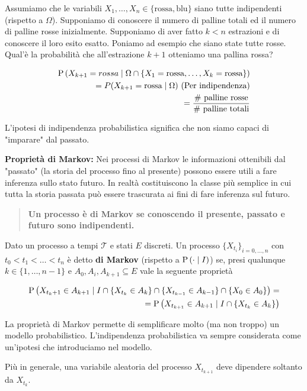 \begin{exmp}
	Assumiamo che le variabili $ X_1, \hdots, X_n \in \{\text{rossa}, \text{blu}\} $ siano tutte indipendenti (rispetto a $ \Omega $). Supponiamo di conoscere il numero di palline totali ed il numero di palline rosse inizialmente. Supponiamo di aver fatto $ k < n $ estrazioni e di conoscere il loro esito esatto. Poniamo ad esempio che siano state tutte rosse. Qual'\`e la probabilit\`a che all'estrazione $ k+1 $ otteniamo una pallina rossa?
	
	\begin{equation*}
	\begin{aligned}
	\text{P}\left(X_{k+1} = rossa \mid \Omega \cap \{X_1 = \text{rossa}, \hdots, X_k = \text{rossa} \} \right) \\
	= P(X_{k+1} = \text{rossa} \mid \Omega)	\text{  (Per indipendenza)} \\
	= \dfrac{\text{\# palline rosse}}{\text{\# palline totali}}
	\end{aligned}
	\end{equation*}
	
	L'ipotesi di indipendenza probabilistica significa che non siamo capaci di "imparare" dal passato.
	
\end{exmp}

\begin{defn}
	\textbf{Propriet\`a di Markov:}
	Nei processi di Markov le informazioni ottenibili dal "passato" (la storia del processo fino al presente) possono essere utili a fare inferenza sullo stato futuro. In realt\`a costituiscono la classe pi\`u semplice in cui tutta la storia passata pu\`o essere trascurata ai fini di fare inferenza sul futuro.
	
	\begin{quote}
		\textbf{Un processo \`e di Markov se conoscendo il presente, passato e futuro sono indipendenti.}
	\end{quote}

	Dato un processo a tempi $ \mathcal{T} $ e stati $ E $ discreti. Un processo  $ \{X_{t_i}\}_{i=0, \hdots, n} $ con $ t_0 < t_1 < \hdots < t_n$ \`e detto \textbf{di Markov} (rispetto a $ \text{P}\left(\cdot \mid I\right) $) se, presi qualunque $ k \in \{1, \hdots, n-1\} $ e $ A_0, A_i, A_{k+1} \subseteq E$ vale la seguente propriet\`a
	
	\begin{equation*}
		\begin{aligned}
		\text{P}\left(X_{t_k+1} \in A_{k+1} \mid I \cap \{X_{t_k} \in A_k\} \cap \{X_{t_{k-1}} \in A_{k-1}\} \cap \{X_0 \in A_0\}\right) = \\
		= \text{P}\left(X_{t_{k+1}} \in A_{k+1} \mid I \cap \{X_{t_k} \in A_k\}\right)
		\end{aligned}
	\end{equation*} 
	
	La propriet\`a di Markov permette di semplificare molto (ma non troppo) un modello probabilistico. L'indipendenza probabilistica va sempre considerata come un'ipotesi che introduciamo nel modello.
	
	Pi\`u in generale, una variabile aleatoria del processo $ X_{t_{k+1}} $ deve dipendere soltanto da $ X_{t_{k}} $. 
\end{defn}

